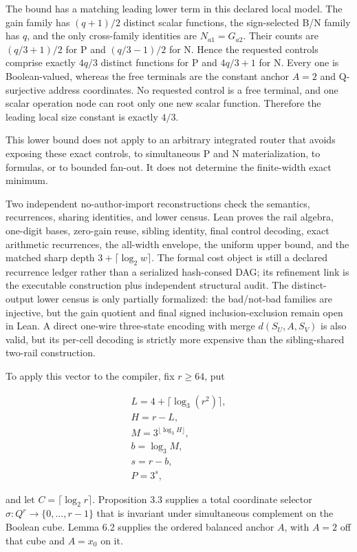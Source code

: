 \documentclass[
  11pt,
]{article}
\theoremstyle{definition}
\theoremstyle{remark}
\begin{document}
The bound has a matching leading lower term in this declared local
model. The gain family has \((q+1)/2\) distinct scalar functions, the
sign-selected B/N family has \(q\), and the only cross-family identities
are \(N_{a1}=G_{a2}\). Their counts are \((q/3+1)/2\) for P and
\((q/3-1)/2\) for N. Hence the requested controls comprise exactly
\(4q/3\) distinct functions for P and \(4q/3+1\) for N. Every one is
Boolean-valued, whereas the free terminals are the constant anchor
\(A=2\) and Q-surjective address coordinates. No requested control is a
free terminal, and one scalar operation node can root only one new
scalar function. Therefore the leading local size constant is exactly
\(4/3\).

This lower bound does not apply to an arbitrary integrated router that
avoids exposing these exact controls, to simultaneous P and N
materialization, to formulas, or to bounded fan-out. It does not
determine the finite-width exact minimum.

Two independent no-author-import reconstructions check the semantics,
recurrences, sharing identities, and lower census. Lean proves the rail
algebra, one-digit bases, zero-gain reuse, sibling identity, final
control decoding, exact arithmetic recurrences, the all-width envelope,
the uniform upper bound, and the matched sharp depth
\(3+\lceil \log_2 w \rceil\). The formal cost object is still a declared
recurrence ledger rather than a serialized hash-consed DAG; its
refinement link is the executable construction plus independent
structural audit. The distinct-output lower census is only partially
formalized: the bad/not-bad families are injective, but the gain
quotient and final signed inclusion-exclusion remain open in Lean. A
direct one-wire three-state encoding with merge \(d(S_U,A,S_V)\) is also
valid, but its per-cell decoding is strictly more expensive than the
sibling-shared two-rail construction.

To apply this vector to the compiler, fix \(r\ge 64\), put

\[
\begin{aligned}
L=4+\lceil \log_3(r^2) \rceil, \\
H=r-L, \\
M=3^{\lfloor \log_3 H \rfloor}, \\
b=\log_3 M, \\
s=r-b, \\
P=3^s,
\end{aligned}
\]

and let \(C=\lceil \log_2 r \rceil\). Proposition 3.3 supplies a total
coordinate selector \(\sigma:Q^r\to \{0,\ldots ,r-1\}\) that is
invariant under simultaneous complement on the Boolean cube. Lemma 6.2
supplies the ordered balanced anchor \(A\), with \(A=2\) off that cube
and \(A=x_0\) on it.
\end{document}
